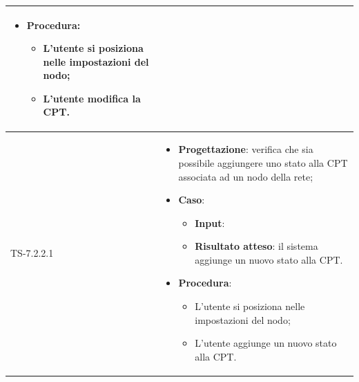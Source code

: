 \begin{longtable}{|C{2.5cm}|C{13cm}|}
\begin{itemize}
\begin{itemize}
	\end{itemize}
	\item \textbf{Procedura}:
	\begin{itemize}
		\item L'utente si posiziona nelle impostazioni del nodo;
		\item L'utente modifica la CPT.
	\end{itemize} 
\end{itemize}
	 \\
	\hline
	{TS-7.2.2.1} &
\begin{itemize}
	\item \textbf{Progettazione}: verifica che sia possibile aggiungere uno
	stato alla CPT associata ad un nodo della rete;
	\item \textbf{Caso}: 
	\begin{itemize}
		\item \textbf{Input}: 
		\item \textbf{Risultato atteso}: il sistema aggiunge un nuovo stato alla CPT.
	\end{itemize}
	\item \textbf{Procedura}:
	\begin{itemize}
		\item L'utente si posiziona nelle impostazioni del nodo;
		\item L'utente aggiunge un nuovo stato alla CPT.
	\end{itemize} 
\end{itemize}
	 

\end{longtable}
